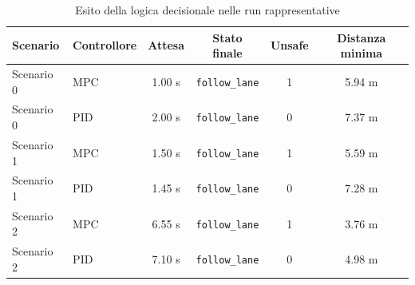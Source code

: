 \begin{table}[H]
    \centering
    \caption{Esito della logica decisionale nelle run rappresentative}
    \begin{tabular}{llcccc}
        \toprule
        \textbf{Scenario} & \textbf{Controllore} & \textbf{Attesa} & \textbf{Stato finale} & \textbf{Unsafe} & \textbf{Distanza minima} \\
        \midrule
        Scenario 0 & MPC & 1.00 s & \texttt{follow\_lane} & 1 & 5.94 m \\
        Scenario 0 & PID & 2.00 s & \texttt{follow\_lane} & 0 & 7.37 m \\
        Scenario 1 & MPC & 1.50 s & \texttt{follow\_lane} & 1 & 5.59 m \\
        Scenario 1 & PID & 1.45 s & \texttt{follow\_lane} & 0 & 7.28 m \\
        Scenario 2 & MPC & 6.55 s & \texttt{follow\_lane} & 1 & 3.76 m \\
        Scenario 2 & PID & 7.10 s & \texttt{follow\_lane} & 0 & 4.98 m \\
        \bottomrule
    \end{tabular}
\end{table}
